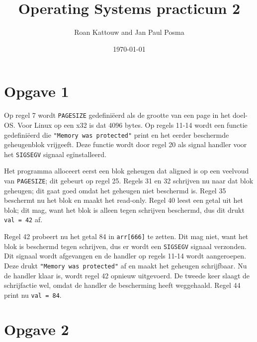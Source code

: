 \documentclass[11pt]{article}
\begin{document}
\author{Roan Kattouw and Jan Paul Posma}
\date{\today}
\title{Operating Systems practicum 2}

\maketitle

\section*{Opgave 1}
Op regel 7 wordt \verb+PAGESIZE+ gedefini\"eerd als de grootte van een page in het doel-OS.
Voor Linux op een x32 is dat 4096 bytes. Op regels 11-14 wordt een functie gedefini\"eerd die
\verb+"Memory was protected"+ print en het eerder beschermde geheugenblok vrijgeeft. Deze functie
wordt door regel 20 als signal handler voor het \verb+SIGSEGV+ signaal eg\"installeerd.

Het programma alloceert eerst een blok geheugen dat aligned is op een veelvoud van \verb+PAGESIZE+;
dit gebeurt op regel 25. Regels 31 en 32 schrijven nu naar dat blok geheugen; dit gaat goed
omdat het geheugen niet beschermd is. Regel 35 beschermt nu het blok en maakt het read-only.
Regel 40 leest een getal uit het blok; dit mag, want het blok is alleen tegen schrijven
beschermd, dus dit drukt \verb+val = 42+ af.

Regel 42 probeert nu het getal 84 in \verb+arr[666]+ te zetten. Dit mag niet, want het blok
is beschermd tegen schrijven, dus er wordt een \verb+SIGSEGV+ signaal verzonden. Dit signaal
wordt afgevangen en de handler op regels 11-14 wordt aangeroepen. Deze drukt \verb+"Memory was protected"+
af en maakt het geheugen schrijfbaar. Nu de handler klaar is, wordt regel 42 opnieuw uitgevoerd.
De tweede keer slaagt de schrijfactie wel, omdat de handler de bescherming heeft weggehaald.
Regel 44 print nu \verb+val = 84+.

\section*{Opgave 2}
\end{document}
